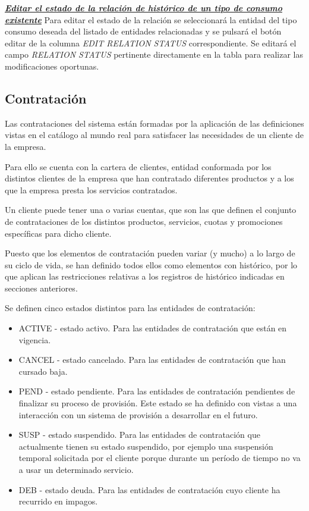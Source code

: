 \underline{\textsl{\textbf{Editar el estado de la relación de histórico de un tipo de consumo existente}}}
Para editar el estado de la relación se seleccionará la entidad del tipo consumo  deseada del listado de entidades relacionadas y se pulsará el botón editar de la columna \textit{EDIT RELATION STATUS} correspondiente. Se editará el campo \emph{RELATION STATUS} pertinente directamente en la tabla para realizar las modificaciones oportunas.




\subsection{Contratación}
\label{sub:contratacion}

Las contrataciones del sistema están formadas por la aplicación de las definiciones vistas en el catálogo al mundo real para satisfacer las necesidades de un cliente de la empresa.

Para ello se cuenta con la cartera de clientes, entidad conformada por los distintos clientes de la empresa que han contratado diferentes productos y a los que la empresa presta los servicios contratados.

Un cliente puede tener una o varias cuentas, que son las que definen el conjunto de contrataciones de los distintos productos, servicios, cuotas y promociones específicas para dicho cliente.

Puesto que los elementos de contratación pueden variar (y mucho) a lo largo de su ciclo de vida, se han definido todos ellos como elementos con histórico, por lo que aplican las restricciones relativas a los registros de histórico indicadas en secciones anteriores.

Se definen cinco estados distintos para las entidades de contratación:
\begin{itemize}
\item ACTIVE - estado activo. Para las entidades de contratación que están en vigencia.
\item CANCEL - estado cancelado. Para las entidades de contratación que han cursado baja.
\item PEND - estado pendiente. Para las entidades de contratación pendientes de finalizar su proceso de provisión. Este estado se ha definido con vistas a una interacción con un sistema de provisión a desarrollar en el futuro.
\item SUSP - estado suspendido. Para las entidades de contratación que actualmente tienen su estado suspendido, por ejemplo una suspensión temporal solicitada por el cliente porque durante un período de tiempo no va a usar un determinado servicio.
\item DEB - estado deuda. Para las entidades de contratación cuyo cliente ha recurrido en impagos.
\end{itemize}


